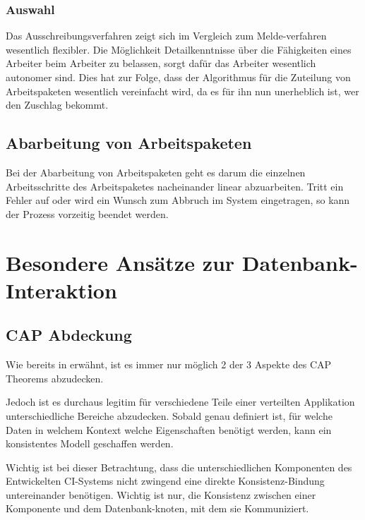 \subsubsection{Auswahl}

Das Ausschreibungsverfahren zeigt sich im Vergleich zum Melde-verfahren
wesentlich flexibler.
Die Möglichkeit Detailkenntnisse über die Fähigkeiten eines Arbeiter 
beim Arbeiter zu belassen, sorgt dafür das Arbeiter wesentlich autonomer sind.
Dies hat zur Folge, dass der Algorithmus für die Zuteilung von Arbeitspaketen wesentlich vereinfacht wird,
da es für ihn nun unerheblich ist, wer den Zuschlag bekommt.

\subsection{Abarbeitung von Arbeitspaketen}

Bei der Abarbeitung von Arbeitspaketen geht es darum die einzelnen Arbeitsschritte
des Arbeitspaketes nacheinander linear abzuarbeiten.
Tritt ein Fehler auf oder wird ein Wunsch zum Abbruch im System eingetragen,
so kann der Prozess vorzeitig beendet werden.


\section{Besondere Ansätze zur Datenbank-Interaktion}



\subsection{CAP Abdeckung}

Wie bereits in  erwähnt,
ist es immer nur möglich 2 der 3 Aspekte des CAP Theorems abzudecken.

Jedoch ist es durchaus legitim für verschiedene Teile
einer verteilten Applikation unterschiedliche Bereiche abzudecken.
Sobald genau definiert ist, für welche Daten in welchem Kontext welche Eigenschaften benötigt werden,
kann ein konsistentes Modell geschaffen werden.

Wichtig ist bei dieser Betrachtung, dass die unterschiedlichen Komponenten des Entwickelten CI-Systems
nicht zwingend eine direkte Konsistenz-Bindung untereinander benötigen.
Wichtig ist nur, die Konsistenz zwischen einer Komponente
und dem Datenbank-knoten, mit dem sie Kommuniziert.

